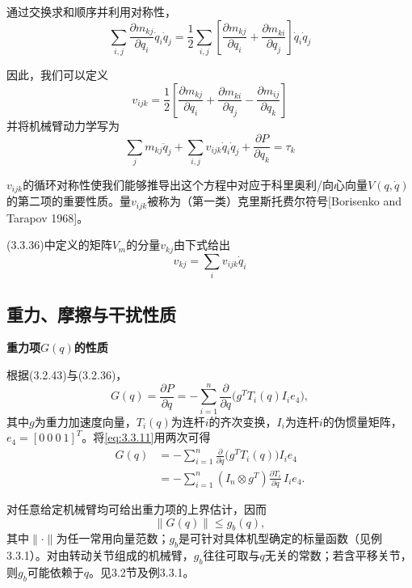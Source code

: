 \documentclass[12pt,a4paper]{ctexart}
\begin{document}
通过交换求和顺序并利用对称性，
\begin{equation}
\sum_{i,j}\frac{\partial m_{kj}}{\partial q_i}\dot{q}_i\dot{q}_j = \frac{1}{2}\sum_{i,j}\left[\frac{\partial m_{kj}}{\partial q_i} + \frac{\partial m_{ki}}{\partial q_j}\right]\dot{q}_i\dot{q}_j
\end{equation}

因此，我们可以定义
\begin{equation}
v_{ijk} = \frac{1}{2}\left[\frac{\partial m_{kj}}{\partial q_i} + \frac{\partial m_{ki}}{\partial q_j} - \frac{\partial m_{ij}}{\partial q_k}\right]
\end{equation}
并将机械臂动力学写为
\begin{equation}
\sum_{j}m_{kj}\ddot{q}_j + \sum_{i,j}v_{ijk}\dot{q}_i\dot{q}_j + \frac{\partial P}{\partial q_k} = \tau_k
\end{equation}

$v_{ijk}$的循环对称性使我们能够推导出这个方程中对应于科里奥利/向心向量$V(q,\dot{q})$的第二项的重要性质。量$v_{ijk}$被称为（第一类）克里斯托费尔符号[Borisenko and Tarapov 1968]。

(3.3.36)中定义的矩阵$V_m$的分量$v_{kj}$由下式给出
\begin{equation}
v_{kj} = \sum_{i}v_{ijk}\dot{q}_i
\end{equation}

\subsection{重力、摩擦与干扰性质}

\textbf{重力项$G(q)$的性质}

根据(3.2.43)与(3.2.36)，
\begin{equation*}
G(q) = \frac{\partial P}{\partial q} = -\sum_{i=1}^{n} \frac{\partial}{\partial q}\bigl(g^T T_i(q) I_i e_4\bigr),
\end{equation*}
其中$g$为重力加速度向量，$T_i(q)$为连杆$i$的齐次变换，$I_i$为连杆$i$的伪惯量矩阵，$e_4=[0\ 0\ 0\ 1]^T$。将\eqref{eq:3.3.11}用两次可得
\begin{equation}\label{eq:3.3.50}
\begin{aligned}
G(q) &= -\sum_{i=1}^{n} \frac{\partial}{\partial q}\bigl(g^T T_i(q)\bigr) I_i e_4 \\[2pt]
&= -\sum_{i=1}^{n} (I_n \otimes g^T)\frac{\partial T_i}{\partial q}\, I_i e_4 .
\end{aligned}
\end{equation}

对任意给定机械臂均可给出重力项的上界估计，因而
\begin{equation}\label{eq:3.3.51}
\|G(q)\| \leq g_b(q),
\end{equation}
其中$\|\cdot\|$为任一常用向量范数；$g_b$是可针对具体机型确定的标量函数（见例3.3.1）。对由转动关节组成的机械臂，$g_b$往往可取与$q$无关的常数；若含平移关节，则$g_b$可能依赖于$q$。见3.2节及例3.3.1。
\end{document}
